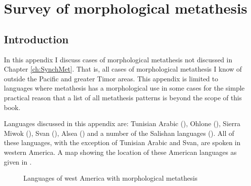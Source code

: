 \chapter{Survey of morphological metathesis}\label{app:MorMet}

\section{Introduction}
In this appendix I discuss cases of morphological metathesis
not discussed in Chapter \ref{ch:SynchMet}.
That is, all cases of morphological metathesis I know of
outside the Pacific and greater Timor areas.
This appendix is limited to languages where metathesis
has a morphological use in some cases for the simple practical reason that
a list of all metathesis patterns is beyond the scope of this book.

Languages discussed in this appendix are:
Tunisian Arabic (),
Ohlone (), Sierra Miwok (), Svan (),
Alsea () and a number of the Salishan languages ().
All of these languages, with the exception of Tunisian Arabic
and Svan, are spoken in western America.
A map showing the location of these American languages
as given in .

\begin{figure}[h]
	\centering
		\setlength\fboxsep{-0.5pt}\setlength\fboxrule{0.75pt}
		\caption{Languages of west America with morphological metathesis}\label{fig:LanWesAmeMorMet}
\end{figure}







